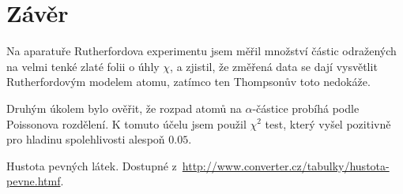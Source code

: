 \documentclass[a4paper,11pt]{article}
\begin{document}
\section{Závěr}

Na aparatuře Rutherfordova experimentu jsem měřil množství částic odražených na velmi tenké zlaté folii o úhly $ \chi $, a zjistil, že změřená data se dají vysvětlit Rutherfordovým modelem atomu, zatímco ten Thompsonův toto nedokáže. 

Druhým úkolem bylo ověřit, že rozpad atomů na $ \alpha $-částice probíhá podle Poissonova rozdělení. K tomuto účelu jsem použil $ \chi^2 $ test, který vyšel pozitivně pro hladinu spolehlivosti alespoň $ 0.05 $.

\begin{thebibliography}{0}
 Hustota pevných látek. Dostupné z~\url{http://www.converter.cz/tabulky/hustota-pevne.htmf}.   
\end{thebibliography}
\end{document}
